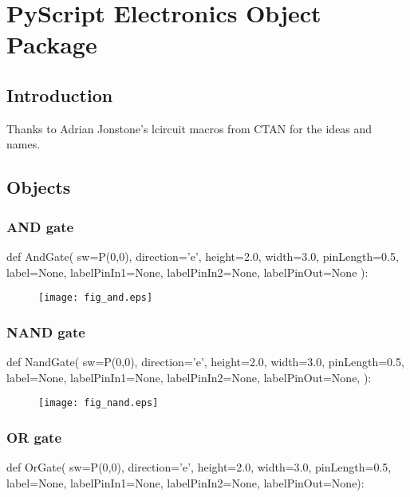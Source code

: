 \chapter{PyScript Electronics Object Package}

\section{Introduction}

Thanks to Adrian Jonstone's lcircuit macros from CTAN for the ideas
and names.

\section{Objects}

\subsection{AND gate}
\label{func:electronicsAnd}
\begin{python}
def AndGate(
    sw=P(0,0),
    direction='e',
    height=2.0,
    width=3.0,
    pinLength=0.5,
    label=None,
    labelPinIn1=None,
    labelPinIn2=None,
    labelPinOut=None
    ):
\end{python}

\begin{figure}[!h]
\centerline{\texttt{[image: fig\_and.eps]}}
\end{figure}

\subsection{NAND gate}
\label{func:electronicsNand}
\begin{python}
def NandGate(
        sw=P(0,0),
        direction='e',
        height=2.0,
        width=3.0,
        pinLength=0.5,
        label=None,
        labelPinIn1=None,
        labelPinIn2=None,
        labelPinOut=None,
        ):
\end{python}

\begin{figure}[!h]
\centerline{\texttt{[image: fig\_nand.eps]}}
\end{figure}

\subsection{OR gate}
\label{func:electronicsOr}
\begin{python}
def OrGate(
        sw=P(0,0),
        direction='e',
        height=2.0,
        width=3.0,
        pinLength=0.5,
        label=None,
        labelPinIn1=None,
        labelPinIn2=None,
        labelPinOut=None):
\end{python}

